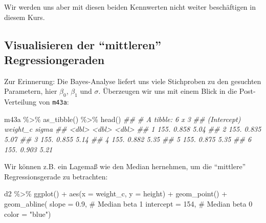 \documentclass[
  a4paper,
  DIV=11]{scrreprt}
\newenvironment{Shaded}{\begin{snugshade}}{\end{snugshade}}
\newcommand{\AttributeTok}[1]{\textcolor[rgb]{0.40,0.45,0.13}{#1}}
\newcommand{\CommentTok}[1]{\textcolor[rgb]{0.37,0.37,0.37}{#1}}
\newcommand{\DecValTok}[1]{\textcolor[rgb]{0.68,0.00,0.00}{#1}}
\newcommand{\DocumentationTok}[1]{\textcolor[rgb]{0.37,0.37,0.37}{\textit{#1}}}
\newcommand{\FloatTok}[1]{\textcolor[rgb]{0.68,0.00,0.00}{#1}}
\newcommand{\FunctionTok}[1]{\textcolor[rgb]{0.28,0.35,0.67}{#1}}
\newcommand{\NormalTok}[1]{\textcolor[rgb]{0.00,0.23,0.31}{#1}}
\newcommand{\SpecialCharTok}[1]{\textcolor[rgb]{0.37,0.37,0.37}{#1}}
\newcommand{\StringTok}[1]{\textcolor[rgb]{0.13,0.47,0.30}{#1}}
\theoremstyle{definition}
\theoremstyle{remark}
\begin{document}
Wir werden uns aber mit diesen beiden Kennwerten nicht weiter
beschäftigen in diesem Kurs.

\hypertarget{visualisieren-der-mittleren-regressiongeraden}{%
\subsection{Visualisieren der ``mittleren''
Regressiongeraden}\label{visualisieren-der-mittleren-regressiongeraden}}

Zur Erinnerung: Die Bayes-Analyse liefert uns viele Stichproben zu den
gesuchten Parametern, hier \(\beta_0\), \(\beta_1\) und \(\sigma\).
Überzeugen wir uns mit einem Blick in die Post-Verteilung von
\texttt{m43a}:

\begin{Shaded}
\begin{Highlighting}[]
\NormalTok{m43a }\SpecialCharTok{\%\textgreater{}\%} 
  \FunctionTok{as\_tibble}\NormalTok{() }\SpecialCharTok{\%\textgreater{}\%} 
  \FunctionTok{head}\NormalTok{()}
\DocumentationTok{\#\# \# A tibble: 6 x 3}
\DocumentationTok{\#\#   \textasciigrave{}(Intercept)\textasciigrave{} weight\_c sigma}
\DocumentationTok{\#\#           \textless{}dbl\textgreater{}    \textless{}dbl\textgreater{} \textless{}dbl\textgreater{}}
\DocumentationTok{\#\# 1          155.    0.858  5.04}
\DocumentationTok{\#\# 2          155.    0.835  5.07}
\DocumentationTok{\#\# 3          155.    0.855  5.14}
\DocumentationTok{\#\# 4          155.    0.882  5.35}
\DocumentationTok{\#\# 5          155.    0.875  5.35}
\DocumentationTok{\#\# 6          155.    0.903  5.21}
\end{Highlighting}
\end{Shaded}

Wir können z.B. ein Lagemaß wie den Median hernehmen, um die
``mittlere'' Regressionsgerade zu betrachten:

\begin{Shaded}
\begin{Highlighting}[]
\NormalTok{d2 }\SpecialCharTok{\%\textgreater{}\%} 
  \FunctionTok{ggplot}\NormalTok{() }\SpecialCharTok{+}
  \FunctionTok{aes}\NormalTok{(}\AttributeTok{x =}\NormalTok{ weight\_c, }\AttributeTok{y =}\NormalTok{ height) }\SpecialCharTok{+}
  \FunctionTok{geom\_point}\NormalTok{() }\SpecialCharTok{+}
  \FunctionTok{geom\_abline}\NormalTok{(}
    \AttributeTok{slope =} \FloatTok{0.9}\NormalTok{,  }\CommentTok{\# Median beta 1}
    \AttributeTok{intercept =} \DecValTok{154}\NormalTok{,  }\CommentTok{\# Median beta 0}
    \AttributeTok{color =} \StringTok{"blue"}\NormalTok{)}
\end{Highlighting}
\end{Shaded}
\end{document}
